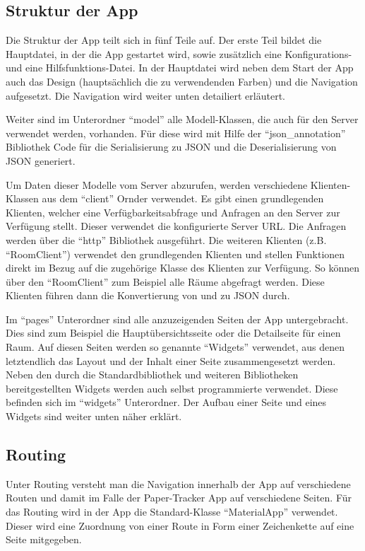 \subsection{Struktur der App}

Die Struktur der App teilt sich in fünf Teile auf.
Der erste Teil bildet die Hauptdatei, in der die App gestartet wird, sowie zusätzlich eine Konfigurations- und eine
Hilfsfunktions-Datei.
In der Hauptdatei wird neben dem Start der App auch das Design (hauptsächlich die zu verwendenden Farben) und die
Navigation aufgesetzt.
Die Navigation wird weiter unten detailiert erläutert.

Weiter sind im Unterordner \enquote{model} alle Modell-Klassen, die auch für den Server verwendet werden, vorhanden.
Für diese wird mit Hilfe der \enquote{json\_annotation} Bibliothek Code für die Serialisierung zu \gls{JSON} und die
Deserialisierung von \gls{JSON} generiert.

Um Daten dieser Modelle vom Server abzurufen, werden verschiedene Klienten-Klassen aus dem \enquote{client} Ornder verwendet.
Es gibt einen grundlegenden Klienten, welcher eine Verfügbarkeitsabfrage und Anfragen an den Server zur Verfügung stellt.
Dieser verwendet die konfigurierte Server \gls{URL}.
Die Anfragen werden über die \enquote{http} Bibliothek ausgeführt.
Die weiteren Klienten (z.B. \enquote{RoomClient}) verwendet den grundlegenden Klienten und stellen Funktionen direkt im Bezug
auf die zugehörige Klasse des Klienten zur Verfügung.
So können über den \enquote{RoomClient} zum Beispiel alle Räume abgefragt werden.
Diese Klienten führen dann die Konvertierung von und zu \gls{JSON} durch.

Im \enquote{pages} Unterordner sind alle anzuzeigenden Seiten der App untergebracht.
Dies sind zum Beispiel die Hauptübersichtsseite oder die Detailseite für einen Raum.
Auf diesen Seiten werden so genannte \enquote{Widgets} verwendet, aus denen letztendlich das Layout und der Inhalt einer
Seite zusammengesetzt werden.
Neben den durch die Standardbibliothek und weiteren Bibliotheken bereitgestellten Widgets werden auch selbst programmierte verwendet.
Diese befinden sich im \enquote{widgets} Unterordner.
Der Aufbau einer Seite und eines Widgets sind weiter unten näher erklärt.

\subsection{Routing}

Unter Routing versteht man die Navigation innerhalb der App auf verschiedene Routen und damit im Falle der Paper-Tracker
App auf verschiedene Seiten.
Für das Routing wird in der App die Standard-Klasse \enquote{MaterialApp} verwendet.
Dieser wird eine Zuordnung von einer Route in Form einer Zeichenkette auf eine Seite mitgegeben.

